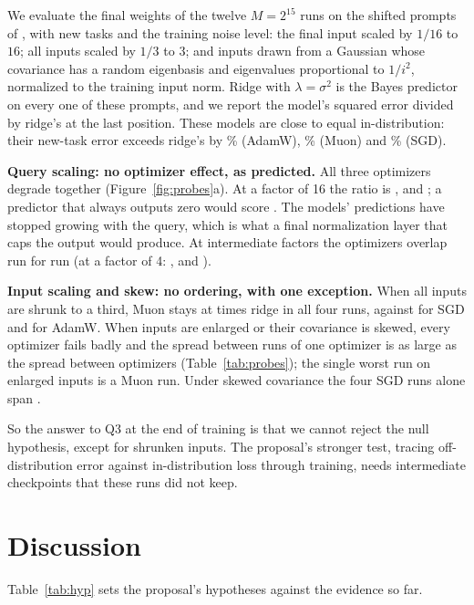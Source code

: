 \documentclass[11pt]{article}
\begin{document}
We evaluate the final weights of the twelve $M = 2^{15}$ runs on the shifted prompts of \citet{garg2022}, with new tasks and the training noise level: the final input scaled by $1/16$ to $16$; all inputs scaled by $1/3$ to $3$; and inputs drawn from a Gaussian whose covariance has a random eigenbasis and eigenvalues proportional to $1/i^{2}$, normalized to the training input norm. Ridge with $\lambda = \sigma^{2}$ is the Bayes predictor on every one of these prompts, and we report the model's squared error divided by ridge's at the last position. These models are close to equal in-distribution: their new-task error exceeds ridge's by \IdExcessAdamw\% (AdamW), \IdExcessMuon\% (Muon) and \IdExcessSgd\% (SGD).

\textbf{Query scaling: no optimizer effect, as predicted.} All three optimizers degrade together (Figure~\ref{fig:probes}a). At a factor of 16 the ratio is \ProbeQuerySixteenAdamw{}, \ProbeQuerySixteenMuon{} and \ProbeQuerySixteenSgd{}; a predictor that always outputs zero would score \ProbeZero{}. The models' predictions have stopped growing with the query, which is what a final normalization layer that caps the output would produce. At intermediate factors the optimizers overlap run for run (at a factor of 4: \ProbeQueryFourAdamw{}, \ProbeQueryFourMuon{} and \ProbeQueryFourSgd{}).

\textbf{Input scaling and skew: no ordering, with one exception.} When all inputs are shrunk to a third, Muon stays at \ProbeInputThirdMuon{} times ridge in all four runs, against \ProbeInputThirdSgd{} for SGD and \ProbeInputThirdAdamw{} for AdamW. When inputs are enlarged or their covariance is skewed, every optimizer fails badly and the spread between runs of one optimizer is as large as the spread between optimizers (Table~\ref{tab:probes}); the single worst run on enlarged inputs is a Muon run. Under skewed covariance the four SGD runs alone span \ProbeSkewSgd{}.

So the answer to Q3 at the end of training is that we cannot reject the null hypothesis, except for shrunken inputs. The proposal's stronger test, tracing off-distribution error against in-distribution loss through training, needs intermediate checkpoints that these runs did not keep.

\section{Discussion}

Table~\ref{tab:hyp} sets the proposal's hypotheses against the evidence so far.
\end{document}
